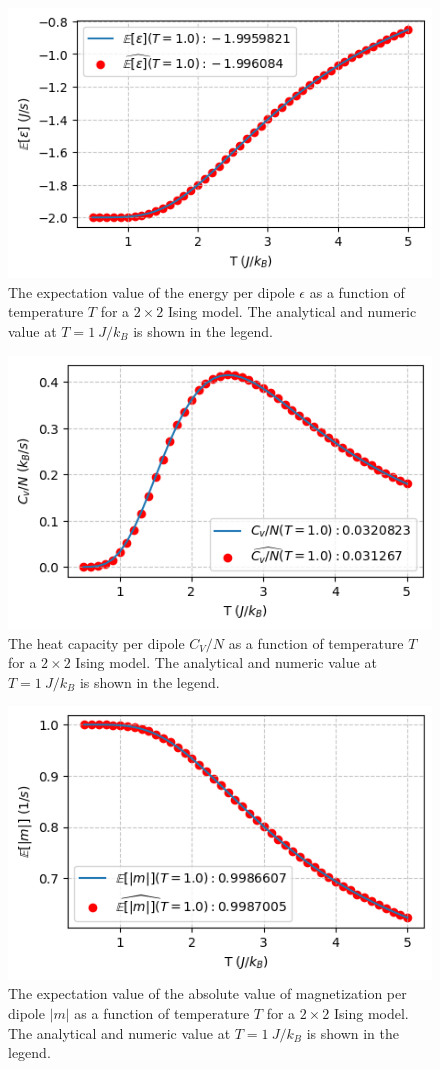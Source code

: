 \documentclass[../main_proj4_correct_template.tex]{subfiles}
\begin{document}
\begin{figure}[h!]
    \centering
    \includegraphics[width=0.8\linewidth]{Project 4/figures/p4_eps.png}
    \caption{The expectation value of the energy per dipole $\epsilon$ as a function of temperature $T$ for a $2\times 2$ Ising model. The analytical and numeric value at $T=1~J/k_B$ is shown in the legend.}
    \label{fig:p4_eps}
\end{figure}
\begin{figure}[h!]
    \centering
    \includegraphics[width=0.8\linewidth]{Project 4/figures/p4_cv.png}
    \caption{The heat capacity per dipole $C_V/N$ as a function of temperature $T$ for a $2\times 2$ Ising model. The analytical and numeric value at $T=1~J/k_B$ is shown in the legend.}
    \label{fig:p4_cv}
\end{figure}
\begin{figure}[h!]
    \centering
    \includegraphics[width=0.8\linewidth]{Project 4/figures/p4_mabs.png}
    \caption{The expectation value of the absolute value of magnetization per dipole $|m|$ as a function of temperature $T$ for a $2\times 2$ Ising model. The analytical and numeric value at $T=1~J/k_B$ is shown in the legend.}
    \label{fig:p4_mabs}
\end{figure}
\end{document}

